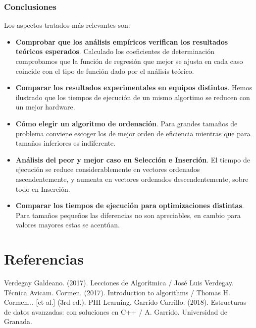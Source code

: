 \documentclass[8pt, aspectratio=169]{beamer}
\begin{document}
    \begin{frame}
        \frametitle{Conclusiones}

        Los aspectos tratados más relevantes son:

        \begin{itemize}
            \item \textbf{Comprobar que los análisis empíricos verifican los resultados teóricos esperados}.
            Calculado los coeficientes de determinación comprobamos que la función de regresión que mejor se 
            ajusta en cada caso coincide con el tipo de función dado por el análisis teórico.
            \item \textbf{Comparar los resultados experimentales en equipos distintos}. Hemos ilustrado que los 
            tiempos de ejecución de un mismo algortimo se reducen con un mejor hardware.
            \item \textbf{Cómo elegir un algoritmo de ordenación}. Para grandes tamaños de problema conviene escoger
            los de mejor orden de eficiencia mientras que para tamaños inferiores es indiferente.
            \item \textbf{Análisis del peor y mejor caso en Selección e Inserción}. El tiempo de ejecución se reduce considerablemente
            en vectores ordenados ascendentemente, y aumenta en vectores ordenados descendentemente, sobre todo en Inserción. 
            \item \textbf{Comparar los tiempos de ejecución para optimizaciones distintas}. Para tamaños pequeños
            las diferencias no son apreciables, en cambio para valores mayores estas se acentúan.
        \end{itemize}
        
    \end{frame}

    \section{Referencias}

    \begin{frame}
        \begin{thebibliography}{0}
             Verdegay Galdeano. (2017). Lecciones de Algorítmica / José Luis Verdegay. Técnica Avicam.
             Cormen. (2017). Introduction to algorithms / Thomas H. Cormen... [et al.] (3rd ed.). PHI Learning.
             Garrido Carrillo. (2018). Estructuras de datos avanzadas: con soluciones en C++ / A. Garrido. Universidad de Granada.        
        \end{thebibliography}
    \end{frame}
    

	
\end{document}

